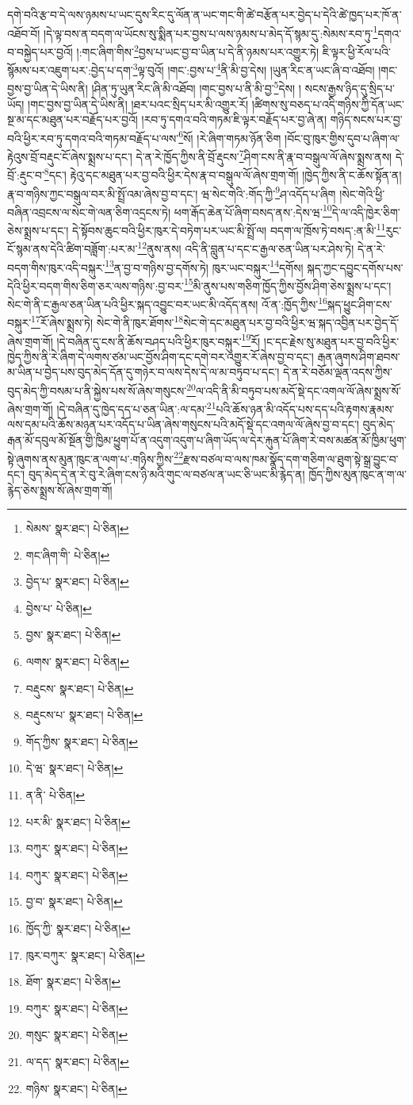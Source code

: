 དགེ་བའི་རྩ་བ་དེ་ལས་ཉམས་པ་ཡང་དུས་རིང་དུ་ལོན་ན་ཡང་གང་གི་ཚེ་བརྩོན་པར་བྱེད་པ་དེའི་ཚེ་ཁྱད་པར་ཁོ་ན་འཐོབ་བོ། །དེ་ལྟ་བས་ན་བདག་ལ་ཡོངས་སུ་སྨིན་པར་བྱས་པ་ལས་ཉམས་པ་མེད་དོ་སྙམ་དུ་:སེམས་རབ་ཏུ་\footnote{སེམས་  སྣར་ཐང་།  པེ་ཅིན། }དགའ་བ་བསྐྱེད་པར་བྱའོ། །:གང་ཞིག་གིས་\footnote{གང་ཞིག་གི་  པེ་ཅིན། }བྱས་པ་ཡང་བྱ་བ་ཡིན་པ་དེ་ནི་ཉམས་པར་འགྱུར་ཏེ། ཇི་ལྟར་ཕྱི་རོལ་པའི་སྙོམས་པར་འཇུག་པར་:བྱེད་པ་དག་\footnote{བྱེད་པ་  སྣར་ཐང་།  པེ་ཅིན། }ལྟ་བུའོ། །གང་:བྱས་པ་\footnote{བྱེས་པ་  པེ་ཅིན། }ནི་མི་བྱ་དེས། །ཡུན་རིང་ན་ཡང་ཞི་བ་འཐོབ། །གང་བྱས་བྱ་ཡིན་དེ་ཡིས་ནི། །ཤིན་ཏུ་ཡུན་རིང་ཞི་མི་འཐོབ། །གང་བྱས་པ་ནི་མི་བྱ་\footnote{བྱས་  སྣར་ཐང་།  པེ་ཅིན། }དེས། །
སངས་རྒྱས་ཉིད་དུ་སྲིད་པ་ཡོད། །གང་བྱས་བྱ་ཡིན་དེ་ཡིས་ནི། །ཐར་པའང་སྲིད་པར་མི་འགྱུར་རོ། །ཚིགས་སུ་བཅད་པ་འདི་གཉིས་ཀྱི་དོན་ཡང་སྔ་མ་དང་མཐུན་པར་བརྗོད་པར་བྱའོ། །རབ་ཏུ་དགའ་བའི་གཏམ་ཇི་ལྟར་བརྗོད་པར་བྱ་ཞེ་ན། གཉིད་སངས་པར་བྱ་བའི་ཕྱིར་རབ་ཏུ་དགའ་བའི་གཏམ་བརྗོད་པ་ལས་\footnote{ལགས་  སྣར་ཐང་།  པེ་ཅིན། }སོ། །རེ་ཞིག་གཏམ་ཉོན་ཅིག །བོང་བུ་ཁུར་གྱིས་དུབ་པ་ཞིག་ལ་རྟེའུས་བྲོ་བརྡུང་ངོ་ཞེས་སྨྲས་པ་དང་། དེ་ན་རེ་ཁྱོད་ཀྱིས་ནི་བྲོ་རྡུངས་\footnote{བརྡུངས་  སྣར་ཐང་།  པེ་ཅིན། }ཤིག་ངས་ནི་རྣ་བ་བསྒུལ་ལོ་ཞེས་སྨྲས་ནས། དེ་བྲོ་:རྡུང་བ་\footnote{བརྡུངས་པ་  སྣར་ཐང་།  པེ་ཅིན། }དང་། རྟེའུ་དང་མཐུན་པར་བྱ་བའི་ཕྱིར་དེས་རྣ་བ་བསྒུལ་ལོ་ཞེས་གྲག་གོ། །ཁྱེད་ཀྱིས་ནི་ང་ཆོས་སྟོན་ན། རྣ་བ་གཉིས་ཀྱང་བསྒུལ་བར་མི་སྤྲོ་འམ་ཞེས་བྱ་བ་དང་། ཝ་སེང་གེའི་:གོད་ཀྱི་\footnote{གོད་ཀྱིས་  སྣར་ཐང་།  པེ་ཅིན། }ཤ་འདོད་པ་ཞིག །སེང་གེའི་ཕྱི་བཞིན་འབྲངས་ལ་སེང་གེ་ལན་ཅིག་འདྲངས་ཏེ། ཕག་རྒོད་ཆེན་པོ་ཞིག་བསད་ནས་:དེས་ཝ་\footnote{དེ་ཝ་  སྣར་ཐང་།  པེ་ཅིན། }དེ་ལ་འདི་ཁྱེར་ཅིག་ཅེས་སྨྲས་པ་དང་། དེ་སྟོབས་ཆུང་བའི་ཕྱིར་ཁུར་དེ་བཏེག་པར་ཡང་མི་སྤྲོ་ལ། བདག་ལ་ཁྲོས་ཏེ་བསད་:ན་མི་\footnote{ན་ནི་  པེ་ཅིན། }རུང་ངོ་སྙམ་ནས་དེའི་ཚིག་བཟློག་:པར་མ་\footnote{པར་མི་  སྣར་ཐང་།  པེ་ཅིན། }ནུས་ནས། འདི་ནི་བླུན་པ་དང་ང་རྒྱལ་ཅན་ཡིན་པར་ཤེས་ཏེ། དེ་ན་རེ་བདག་གིས་ཁུར་འདི་བསྐུར་\footnote{བཀུར་  སྣར་ཐང་།  པེ་ཅིན། }ན་བྱ་བ་གཉིས་བྱ་དགོས་ཏེ། ཁུར་ཡང་བསྐུར་\footnote{བཀུར་  སྣར་ཐང་།  པེ་ཅིན། }དགོས། སྐད་ཀྱང་དབྱུང་དགོས་པས་དེའི་ཕྱིར་བདག་གིས་ཅིག་ཅར་ལས་གཉིས་:བྱ་བར་\footnote{བྱ་བ་  སྣར་ཐང་།  པེ་ཅིན། }མི་ནུས་པས་གཅིག་ཁྱོད་ཀྱིས་བྱོས་ཤིག་ཅེས་སྨྲས་པ་དང་། སེང་གེ་ནི་ང་རྒྱལ་ཅན་ཡིན་པའི་ཕྱིར་སྐད་འབྱུང་བར་ཡང་མི་འདོད་ནས། འོ་ན་:ཁྱོད་ཀྱིས་\footnote{ཁྱོད་ཀྱི་  སྣར་ཐང་།  པེ་ཅིན། }སྐད་ཕྱུང་ཤིག་ངས་བསྐུར་\footnote{ཁུར་བཀུར་  སྣར་ཐང་།  པེ་ཅིན། }རོ་ཞེས་སྨྲས་ཏེ། སེང་གེ་ནི་ཁུར་ཐོགས་\footnote{ཐོག་  སྣར་ཐང་།  པེ་ཅིན། }སེང་གེ་དང་མཐུན་པར་བྱ་བའི་ཕྱིར་ཝ་སྐད་འབྱིན་པར་བྱེད་དོ་ཞེས་གྲག་གོ། །དེ་བཞིན་དུ་ངས་ནི་ཆོས་བཤད་པའི་ཕྱིར་ཁུར་བསྐུར་\footnote{བཀུར་  སྣར་ཐང་།  པེ་ཅིན། }རོ། །ང་དང་རྗེས་སུ་མཐུན་པར་བྱ་བའི་ཕྱིར་ཁྱེད་ཀྱིས་ནི་རེ་ཞིག་དེ་ལགས་ཙམ་ཡང་བྱོས་ཤིག་དང་དགེ་བར་འགྱུར་རོ་ཞེས་བྱ་བ་དང་། རྒན་ཞུགས་ཤིག་ཐབས་མ་ཡིན་པ་བྱེད་པས་བུད་མེད་དོན་དུ་གཉེར་བ་ལས་དེས་དེ་ལ་མ་བཏུབ་པ་དང་། དེ་ན་རེ་བཅོམ་ལྡན་འདས་ཀྱིས་བུད་མེད་ཀྱི་བསམ་པ་ནི་སྐྱེས་པས་སོ་ཞེས་གསུངས་\footnote{གསུང་  སྣར་ཐང་།  པེ་ཅིན། }ལ་འདི་ནི་མི་བཏུབ་པས་མདོ་སྡེ་དང་འགལ་ལོ་ཞེས་སྨྲས་སོ་ཞེས་གྲག་གོ། །དེ་བཞིན་དུ་ཁྱེད་དད་པ་ཅན་ཡིན་:ལ་དམ་\footnote{ལ་དད་  སྣར་ཐང་།  པེ་ཅིན། }པའི་ཆོས་ཉན་མི་འདོད་པས་དད་པའི་རྟགས་རྣམས་ལས་དམ་པའི་ཆོས་མཉན་པར་འདོད་པ་ཡིན་ཞེས་གསུངས་པའི་མདོ་སྡེ་དང་འགལ་ལོ་ཞེས་བྱ་བ་དང་། བུད་མེད་རྒན་མོ་དབུལ་མོ་སྔོན་གྱི་ཁྱིམ་ཕྱུག་པོ་ན་འདུག་འདུག་པ་ཞིག་ཡོད་ལ་དེར་རྐུན་པོ་ཞིག་རེ་བས་མཚན་མོ་ཁྱིམ་ཕུག་སྟེ་ཞུགས་ནས་མུན་ཁུང་ན་ལག་པ་:གཉིས་ཀྱིས་\footnote{གཉིས་  སྣར་ཐང་།  པེ་ཅིན། }རྫས་བཙལ་བ་ལས་ཁམ་སྣོད་དག་གཅིག་ལ་ཐུག་སྟེ་སྒྲ་བྱུང་བ་དང་། བུད་མེད་དེ་ན་རེ་བུ་རེ་ཞིག་ངས་ཉི་མའི་གུང་ལ་བཙལ་ན་ཡང་ཅི་ཡང་མི་རྙེད་ན། ཁྱོད་ཀྱིས་མུན་ཁུང་ན་ག་ལ་རྙེད་ཅེས་སྨྲས་སོ་ཞེས་གྲག་གོ། 